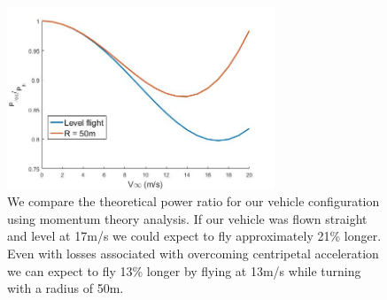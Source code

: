 \begin{figure}
    \centering
    \includegraphics[width=8cm]{images/m100-turn-vs-level.jpg}
    \caption{We compare the theoretical power ratio for our vehicle configuration using momentum theory analysis. If our vehicle was flown straight and level at 17m/s we could expect to fly approximately 21\% longer. Even with losses associated with overcoming centripetal acceleration we can expect to fly 13\% longer by flying at 13m/s while turning with a radius of 50m.}
    \label{m100levelturn}
\end{figure}
